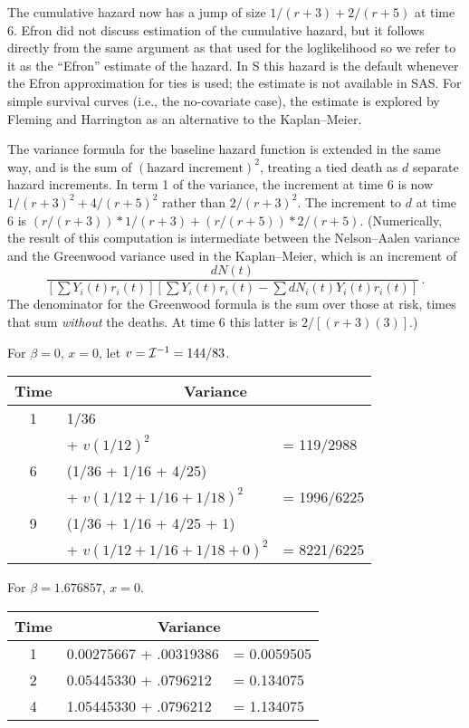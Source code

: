 \documentclass[11pt]{article}
\def\Cvar{{\cal I}^{-1}}
\begin{document}
The cumulative hazard now has a jump of size
$1/(r+3) + 2/(r+5)$ at time 6.
Efron \cite{Efron77} did not discuss estimation of the cumulative
hazard, 
but it follows directly from the same argument as that used for
the loglikelihood so we refer to it as the ``Efron'' estimate of
the hazard.
In S this hazard is the default whenever the Efron approximation for
ties is used; the estimate is not available in SAS.
For simple survival curves (i.e., the no-covariate case), the estimate is
explored by Fleming and Harrington \cite{Fleming84}
as an alternative to the Kaplan--Meier.

  The variance formula for the baseline hazard function
is extended in the same way, and is
the sum of $(\mbox{hazard increment}) ^2$, 
treating a tied death as $d$ separate
hazard increments.
In term 1 of the variance, the increment at time 6 is
now $1/(r+3)^2   + 4/(r+5)^2$ rather than $2/(r+3)^2$.
The increment to $d$ at time 6 is
$(r/(r+3))* 1/(r+3) + (r/(r+5))* 2/(r+5)$.
(Numerically, the result of this
computation is intermediate between the 
Nelson--Aalen variance and the
Greenwood variance used in the Kaplan--Meier, which is
an increment of
$$  \frac{dN(t)}{[\sum Y_i(t)r_i(t)]
	         [\sum Y_i(t)r_i(t) - \sum dN_i(t) Y_i(t)r_i(t)]}\,.$$
The denominator for the Greenwood formula 
is the sum over those at risk, times that sum \emph{without}
the deaths.  
At time 6 this latter is $2/[(r+3)(3)]$.)

 For $\beta=0$, $x=0$, let $v= \Cvar = 144/83$.
\begin{center}
\begin{tabular}{c|ll}
     Time  &   \multicolumn{2}{c}{Variance}\\ \hline 
       1   &      1/36          \\  &
	\quad + $v(1/12)^2  $ &= \phantom{0}119/2988\\
       6   &     (1/36 + 1/16 + 4/25)& \\ 
	         &\quad + $v(1/12 + 1/16+ 1/18)^2$ &= 1996/6225\\
       9   &     (1/36 + 1/16 + 4/25 + 1) \\&
	\quad + $v(1/12 + 1/16 + 1/18 +0)^2$&= 8221/6225\\
\end{tabular}
\end{center}

   For $\beta=1.676857$, $ x=0$.
\begin{center}
\begin{tabular}{c|ll}
     Time  &   \multicolumn{2}{c}{Variance}\\ \hline 
       1  &     0.00275667 + .00319386 & = 0.0059505\\
       2  &     0.05445330 + .0796212  & = 0.134075\\
       4  &     1.05445330 + .0796212   &= 1.134075\\
\end{tabular}
\end{center}
\end{document}
